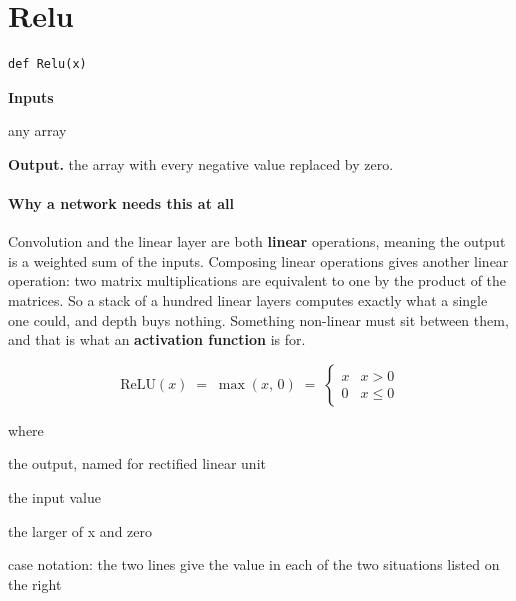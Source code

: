 \section{Relu}
\begin{lstlisting}[style=sig]
def Relu(x)
\end{lstlisting}

\noindent\textbf{Inputs}
\begin{description}[leftmargin=2.2em,style=nextline,font=\normalfont\ttfamily]\setlength\itemsep{1pt}
  \item[{x}] \normalfont any array
\end{description}

\noindent\textbf{Output.} the array with every negative value replaced by zero.


\paragraph{Why a network needs this at all}
Convolution and the linear layer are both \textbf{linear} operations, meaning the output is a weighted sum of the inputs. Composing linear operations gives another linear operation: two matrix multiplications are equivalent to one by the product of the matrices. So a stack of a hundred linear layers computes exactly what a single one could, and depth buys nothing. Something non-linear must sit between them, and that is what an \textbf{activation function} is for.


\begin{equation}
\mathrm{ReLU}(x) \;=\; \max(x,\,0) \;=\; \begin{cases} x & x > 0 \\ 0 & x \le 0 \end{cases}
\end{equation}

\noindent where
\begin{description}[leftmargin=2.4em,style=nextline,font=\normalfont\ttfamily]\setlength\itemsep{1pt}
  \item[{$\mathrm{ReLU}(x)$}] \normalfont the output, named for rectified linear unit
  \item[{$x$}] \normalfont the input value
  \item[{$\max(x,0)$}] \normalfont the larger of x and zero
  \item[{$\begin{cases}\end{cases}$}] \normalfont case notation: the two lines give the value in each of the two situations listed on the right
\end{description}

